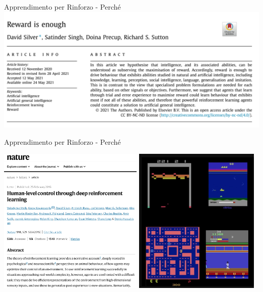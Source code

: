 \documentclass[presentation, 10pt,aspectratio=169]{beamer}\mode<presentation>{\usetheme{AMSBolognaFC}}
\begin{document}
\begin{frame}{Apprendimento per Rinforzo - Perché}
	\includegraphics[width=\textwidth]{img/reward-enough.png}
\end{frame}

\begin{frame}{Apprendimento per Rinforzo - Perché}
	\begin{center}
	\includegraphics[height=7cm]{img/nature-paper.png}
	\includegraphics[height=7cm]{img/atari-dqn.png}
	\end{center} 
\end{frame}
\end{document}
